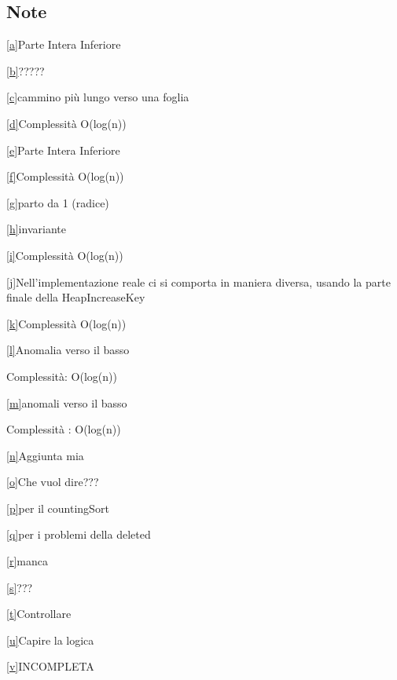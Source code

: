 \documentclass[tikz]{article}
\begin{document}
{{\subsection{Note}

\protect\hyperlink{cmnt_ref1}{{[}a{]}}{Parte Intera Inferiore}

\protect\hyperlink{cmnt_ref2}{{[}b{]}}{?????}

\protect\hyperlink{cmnt_ref3}{{[}c{]}}{cammino più lungo verso una
foglia}

\protect\hyperlink{cmnt_ref4}{{[}d{]}}{Complessità O(log(n))}

\protect\hyperlink{cmnt_ref5}{{[}e{]}}{Parte Intera Inferiore}

\protect\hyperlink{cmnt_ref6}{{[}f{]}}{Complessità O(log(n))}

\protect\hyperlink{cmnt_ref7}{{[}g{]}}{parto da 1 (radice)}

\protect\hyperlink{cmnt_ref8}{{[}h{]}}{invariante}

\protect\hyperlink{cmnt_ref9}{{[}i{]}}{Complessità O(log(n))}

\protect\hyperlink{cmnt_ref10}{{[}j{]}}{Nell'implementazione reale ci si
comporta in maniera diversa, usando la parte finale della
HeapIncreaseKey}

\protect\hyperlink{cmnt_ref11}{{[}k{]}}{Complessità O(log(n))}

\protect\hyperlink{cmnt_ref12}{{[}l{]}}{Anomalia verso il basso}

{Complessità: O(log(n))}

\protect\hyperlink{cmnt_ref13}{{[}m{]}}{anomali verso il basso}

{Complessità : O(log(n))}

\protect\hyperlink{cmnt_ref14}{{[}n{]}}{Aggiunta mia}

\protect\hyperlink{cmnt_ref15}{{[}o{]}}{Che vuol dire???}

\protect\hyperlink{cmnt_ref16}{{[}p{]}}{per il countingSort}

\protect\hyperlink{cmnt_ref17}{{[}q{]}}{per i problemi della deleted}

\protect\hyperlink{cmnt_ref18}{{[}r{]}}{manca}

\protect\hyperlink{cmnt_ref19}{{[}s{]}}{???}

\protect\hyperlink{cmnt_ref20}{{[}t{]}}{Controllare}

\protect\hyperlink{cmnt_ref21}{{[}u{]}}{Capire la logica}

\protect\hyperlink{cmnt_ref22}{{[}v{]}}{INCOMPLETA}

}}
\end{document}
